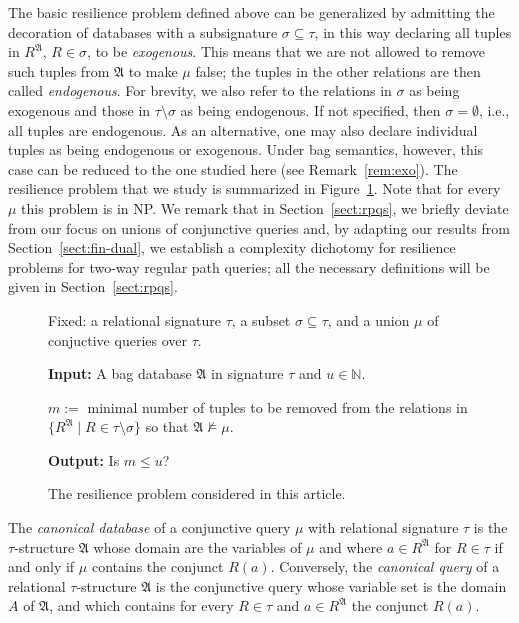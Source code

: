 \documentclass[nonacm]{acmart}
\newcommand{\N}{\mathbb N}
\newcommand{\bA}{{\mathfrak A}}
\begin{document}
The basic resilience problem defined above can
be generalized  by admitting the decoration of databases with a subsignature $\sigma \subseteq \tau$, in this way declaring all tuples in $R^{\bA}$, $R \in \sigma$, to be \emph{exogenous}. This means that we are not allowed to remove such tuples
from  $\bA$ to make $\mu$ false; the tuples in the other relations are then called \emph{endogenous}. For brevity, we also refer to the relations in $\sigma$ as being exogenous and those in $\tau \setminus \sigma$ as being endogenous. If not specified, then $\sigma=\emptyset$, i.e., all tuples are endogenous. As an alternative, one may also
declare individual tuples as being endogenous
or exogenous. Under bag semantics, however,
this case can be reduced to the one studied
here (see Remark~\ref{rem:exo}).
The resilience problem that we study is summarized
in Figure~\ref{fig:res-problem}. Note that 
for every $\mu$ 
this problem is in NP.
We remark that in Section~\ref{sect:rpqs}, we briefly deviate from our focus on unions of conjunctive queries and, by adapting our results from Section~\ref{sect:fin-dual}, we establish a complexity dichotomy for resilience problems for two-way regular path queries; all the necessary definitions will be given in Section~\ref{sect:rpqs}.


\begin{figure} 
\flushleft 
\begin{framed}
Fixed: a relational signature $\tau$, a subset $\sigma \subseteq \tau$, and a union $\mu$ of conjuctive queries over $\tau$. 

\textbf{Input:} A bag database $\bA$ in signature $\tau$ and $u \in \N$.

$m := $ minimal number of tuples to be removed from the relations in $\{R^{\bA} \mid R \in \tau \setminus \sigma \}$
so that $\bA \not \models \mu$.

\textbf{Output:} Is $m \leq u$?
\end{framed}
\caption{The resilience problem considered in this article.} 
\label{fig:res-problem} 
\end{figure}

The \emph{canonical database}
of a conjunctive query $\mu$ with relational signature $\tau$ is the $\tau$-structure $\bA$ whose domain are the variables of $\mu$ and where $a \in R^{\bA}$ for
$R \in \tau$ if and only if $\mu$ contains the conjunct $R(a)$. 
Conversely, the \emph{canonical query} of a relational $\tau$-structure
$\bA$ is the conjunctive query whose variable set is the domain $A$ of $\bA$, and which contains for every $R \in \tau$ and $a \in R^{\bA}$ the conjunct $R(a)$.
\end{document}
